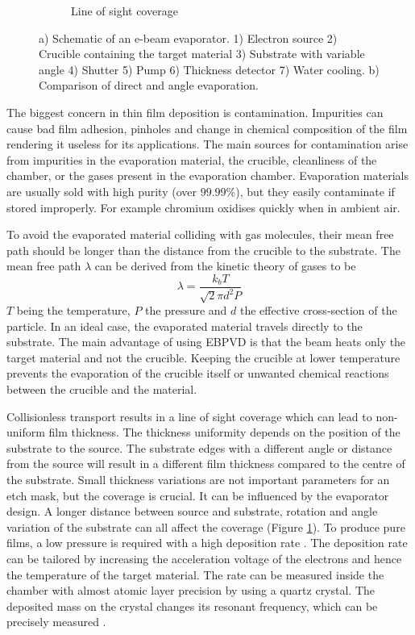 \documentclass[final]{jyflluk}
\begin{document}
\begin{figure}[h]
\begin{subfigure}{0.35\textwidth}
        \caption{Line of sight coverage} \label{fig:angle_evap}
    \end{subfigure}
    \caption{a) Schematic of an e-beam evaporator. 1) Electron source 2) Crucible containing the target material 3) Substrate with variable angle 4) Shutter 5) Pump 6) Thickness detector 7) Water cooling. b) Comparison of direct and angle evaporation. } \label{fig:evap}
\end{figure}



The biggest concern in thin film deposition is contamination. Impurities can cause bad film adhesion, pinholes and change in chemical composition of the film rendering it useless for its applications. The main sources for contamination arise from impurities in the evaporation material, the crucible, cleanliness of the chamber, or the gases present in the evaporation chamber. Evaporation materials are usually sold with high purity (over $99.99 \percent$), but they easily contaminate if stored improperly. For example chromium oxidises quickly when in ambient air. 

To avoid the evaporated material colliding with gas molecules, their mean free path should be longer than the distance from the crucible to the substrate. The mean free path $\lambda$ can be derived from the kinetic theory of gases to be 
%
\begin{equation}
    \label{eq:mean_free}
    \lambda = \frac{k_b T}{\sqrt{2}\pi d^2 P}
 \end{equation}
$T$ being the temperature, $P$ the pressure and $d$ the effective cross-section of the particle. In an ideal case, the evaporated material travels directly to the substrate. The main advantage of using EBPVD is that the beam heats only the target material and not the crucible. Keeping the crucible at lower temperature prevents the evaporation of the crucible itself or unwanted chemical reactions between the crucible and the material. \cite{franssila2010introduction}

Collisionless transport results in a line of sight coverage which can lead to non-uniform film thickness. The thickness uniformity depends on the position of the substrate to the source. The substrate edges with a different angle or distance from the source will result in a different film thickness compared to the centre of the substrate. Small thickness variations are not important parameters for an etch mask, but the coverage is crucial. It can be influenced by the evaporator design. A longer distance between source and substrate, rotation and angle variation of the substrate can all affect the coverage (Figure \ref{fig:angle_evap}).
To produce pure films, a low pressure is required with a high deposition rate \cite{ohring1992materials}. The deposition rate can be tailored by increasing the acceleration voltage of the electrons and hence the temperature of the target material. The rate can be measured inside the chamber with almost atomic layer precision by using a quartz crystal. The deposited mass on the crystal changes its resonant frequency, which can be precisely measured \cite{franssila2010introduction}. 
\end{document}
